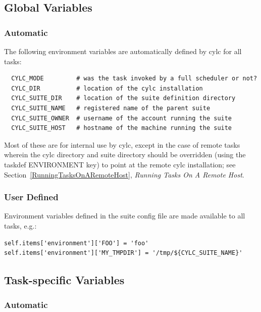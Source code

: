 \documentclass[11pt,a4paper]{article}
\begin{document}
\subsection{Global Variables}
\lstset{language=bash}

\subsubsection{Automatic}
The following environment variables are automatically defined by cylc
for all tasks:

\begin{lstlisting}
  CYLC_MODE         # was the task invoked by a full scheduler or not?
  CYLC_DIR          # location of the cylc installation
  CYLC_SUITE_DIR    # location of the suite definition directory
  CYLC_SUITE_NAME   # registered name of the parent suite 
  CYLC_SUITE_OWNER  # username of the account running the suite
  CYLC_SUITE_HOST   # hostname of the machine running the suite
\end{lstlisting}

Most of these are for internal use by cylc, except in the case of remote
tasks wherein the cylc directory and suite directory should be
overridden (using the taskdef ENVIRONMENT key) to point at the remote
cylc installation; see Section~\ref{RunningTasksOnARemoteHost}, {\em
Running Tasks On A Remote Host}. 

\subsubsection{User Defined}
\label{SuiteWideVariables}

Environment variables defined in the suite config file are made
available to all tasks, e.g.: 

\lstset{language=Python}

\begin{lstlisting}
self.items['environment']['FOO'] = 'foo'
self.items['environment']['MY_TMPDIR'] = '/tmp/${CYLC_SUITE_NAME}'
\end{lstlisting}


\subsection{Task-specific Variables}
\label{TaskSpecificVariables}
\lstset{language=bash}

\subsubsection{Automatic}
\end{document}
